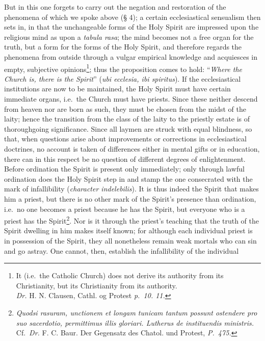 \documentclass[12pt]{book}
\newcommand{\opage}[1]{\marginnote{\footnotesize\textit{[#1]}}}
\begin{document}
\opage{57} \setcounter{footnote}{0}%
But in this one forgets to carry out the negation and restoration of the
phenomena of which we spoke above (§ 4); a certain ecclesiastical sensualism
then sets in, in that the unchangeable forms of the Holy Spirit are impressed
upon the religious mind as upon a \textit{tabula rasa}; the mind becomes not a
free organ for the truth, but a form for the forms of the Holy Spirit, and
therefore regards the phenomena from outside through a vulgar empirical
knowledge and acquiesces in empty, subjective opinions\footnote{It (i.e.\ the
Catholic Church) does not derive its authority from its Christianity, but its
Christianity from its authority.\\
\textit{Dr.} H. N. Clausen, Cathl. og Protest \textit{p.\ 10. 11.}}; thus the
proposition comes to hold: ``\emph{Where the Church is, there is the Spirit}''
(\textit{ubi ecclesia, ibi spiritus}). If the ecclesiastical institutions are
now to be maintained, the Holy Spirit must have certain immediate organs, i.e.\
the Church must have priests. Since these neither descend from heaven nor are
born as such, they must be chosen from the midst of the laity; hence the
transition from the class of the laity to the priestly estate is of thoroughgoing
significance. Since all laymen are struck with equal blindness, so that, when
questions arise about improvements or corrections in ecclesiastical doctrines,
no account is taken of differences either in mental gifts or in education,
there can in this respect be no question of different degrees of enlightenment.
Before ordination the Spirit is present only immediately; only through lawful
ordination does the Holy Spirit step in and stamp the one consecrated with the
mark of infallibility (\textit{character indelebilis}). It is thus indeed the
Spirit that makes him a priest, but there is no other mark of the Spirit's
presence than ordination, i.e.\ no one becomes a priest because he has the
Spirit, but
\opage{58} \setcounter{footnote}{0}%
everyone who is a priest has the Spirit\footnote{\textit{Quodsi rasuram,
unctionem et longam tunicam tantum possunt ostendere pro suo sacerdotio,
permittimus illis gloriari. Lutherus de instituendis ministris.} Cf.\
\textit{Dr.} F. C. Baur. Der Gegensatz des Chatol. und Protest, \textit{P.\
475.}}. Nor is it through the priest's teaching that the truth of the Spirit
dwelling in him makes itself known; for although each individual priest is in
possession of the Spirit, they all nonetheless remain weak mortals who can sin
and go astray. One cannot, then, establish the infallibility of the individual
\end{document}
